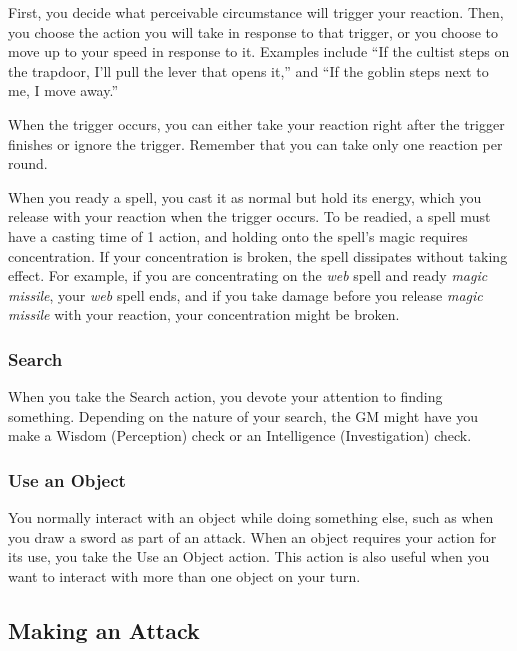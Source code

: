 \documentclass[
]{article}
\begin{document}
First, you decide what perceivable circumstance will trigger your
reaction. Then, you choose the action you will take in response to that
trigger, or you choose to move up to your speed in response to it.
Examples include ``If the cultist steps on the trapdoor, I'll pull the
lever that opens it,'' and ``If the goblin steps next to me, I move
away.''

When the trigger occurs, you can either take your reaction right after
the trigger finishes or ignore the trigger. Remember that you can take
only one reaction per round.

When you ready a spell, you cast it as normal but hold its energy, which
you release with your reaction when the trigger occurs. To be readied, a
spell must have a casting time of 1 action, and holding onto the spell's
magic requires concentration. If your concentration is broken, the spell
dissipates without taking effect. For example, if you are concentrating
on the \emph{web} spell and ready \emph{magic missile}, your \emph{web}
spell ends, and if you take damage before you release \emph{magic
missile} with your reaction, your concentration might be broken.

\hypertarget{search}{%
\subsubsection{Search}\label{search}}

When you take the Search action, you devote your attention to finding
something. Depending on the nature of your search, the GM might have you
make a Wisdom (Perception) check or an Intelligence (Investigation)
check.

\hypertarget{use-an-object}{%
\subsubsection{Use an Object}\label{use-an-object}}

You normally interact with an object while doing something else, such as
when you draw a sword as part of an attack. When an object requires your
action for its use, you take the Use an Object action. This action is
also useful when you want to interact with more than one object on your
turn.

\hypertarget{making-an-attack}{%
\subsection{Making an Attack}\label{making-an-attack}}
\end{document}
